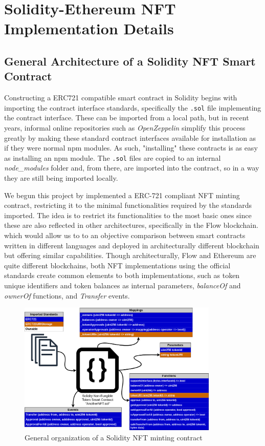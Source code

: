 \documentclass[../main.tex]{subfiles}
\begin{document}
\section{Solidity-Ethereum NFT Implementation Details}
\label{sec:solidity_ethereum_nft_implementation}
\subsection{General Architecture of a Solidity NFT Smart Contract}
Constructing a ERC721 compatible smart contract in Solidity begins with importing the contract interface standards, specifically the \verb|.sol| file implementing the contract interface. These can be imported from a local path, but in recent years, informal online repositories such as \textit{OpenZeppelin} \cite{OpenZeppelin2024} simplify this process greatly by making these standard contract interfaces available for installation as if they were normal npm modules. As such, "installing" these contracts is as easy as installing an npm module. The \verb|.sol| files are copied to an internal \textit{node\_modules} folder and, from there, are imported into the contract, so in a way they are still being imported locally.
\par
We begun this project by implemented a ERC-721 compliant NFT minting contract, restricting it to the minimal functionalities required by the standards imported. The idea is to restrict its functionalities to the most basic ones since these are also reflected in other architectures, specifically in the Flow blockchain. which would allow us to to an objective comparison between smart contracts written in different languages and deployed in architecturally different blockchain but offering similar capabilities. Though architecturally, Flow and Ethereum are quite different blockchains, both NFT implementations using the official standards create common elements to both implementations, such as token unique identifiers and token balances as internal parameters, \textit{balanceOf} and \textit{ownerOf} functions, and \textit{Transfer} events.

\begin{figure}[htp]
    \centering
    \includegraphics[width=0.85\textwidth]{../Images/04_Solidity_NFT_Contract_Arch.png}
    \caption{General organization of a Solidity NFT minting contract}
    \label{fig:solidity_contract_architecture}
\end{figure}
\end{document}
